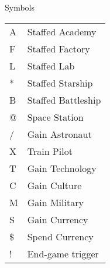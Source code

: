 \begin{flushleft}Symbols\end{flushleft}
\begin{tabular}{ll}
{A}    & Staffed Academy \\
{F}    & Staffed Factory \\
{L}    & Staffed Lab \\
{*}    & Staffed Starship \\
{B}    & Staffed Battleship \\
{@}    & Space Station \\
{/}    & Gain Astronaut \\
{X}    & Train Pilot \\
{T}    & Gain Technology \\
{C}    & Gain Culture \\
{M}    & Gain Military \\
{S}    & Gain Currency \\
{\$}   & Spend Currency \\
{!}    & End-game trigger
\end{tabular}
